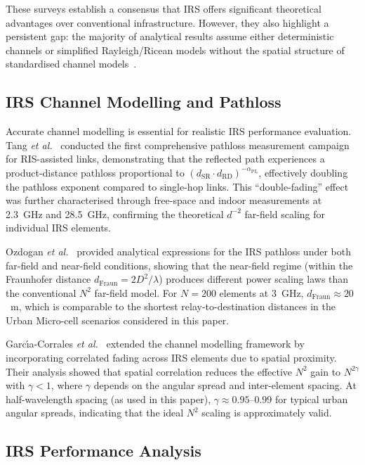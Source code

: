 \documentclass[journal]{IEEEtran} %
\begin{document}
These surveys establish a consensus that IRS offers significant theoretical advantages over conventional infrastructure. However, they also highlight a persistent gap: the majority of analytical results assume either deterministic channels or simplified Rayleigh/Ricean models without the spatial structure of standardised channel models~\cite{pan2022overview}.

\subsection{IRS Channel Modelling and Pathloss}

Accurate channel modelling is essential for realistic IRS performance evaluation. Tang \textit{et al.}~\cite{tang2020irs_pathloss} conducted the first comprehensive pathloss measurement campaign for RIS-assisted links, demonstrating that the reflected path experiences a product-distance pathloss proportional to $(d_{\mathrm{SR}} \cdot d_{\mathrm{RD}})^{-\alpha_{\mathrm{PL}}}$, effectively doubling the pathloss exponent compared to single-hop links. This ``double-fading'' effect was further characterised through free-space and indoor measurements at 2.3~GHz and 28.5~GHz, confirming the theoretical $d^{-2}$ far-field scaling for individual IRS elements.

Ozdogan \textit{et al.}~\cite{ozdogan2020ris_pathloss} provided analytical expressions for the IRS pathloss under both far-field and near-field conditions, showing that the near-field regime (within the Fraunhofer distance $d_{\mathrm{Fraun}} = 2D^2/\lambda$) produces different power scaling laws than the conventional $N^2$ far-field model. For $N = 200$ elements at 3~GHz, $d_{\mathrm{Fraun}} \approx 20$~m, which is comparable to the shortest relay-to-destination distances in the Urban Micro-cell scenarios considered in this paper.

Garc\'{\i}a-Corrales \textit{et al.}~\cite{garcia2023ris_channel} extended the channel modelling framework by incorporating correlated fading across IRS elements due to spatial proximity. Their analysis showed that spatial correlation reduces the effective $N^2$ gain to $N^{2\gamma}$ with $\gamma < 1$, where $\gamma$ depends on the angular spread and inter-element spacing. At half-wavelength spacing (as used in this paper), $\gamma \approx 0.95$--$0.99$ for typical urban angular spreads, indicating that the ideal $N^2$ scaling is approximately valid.

\subsection{IRS Performance Analysis}
\end{document}
